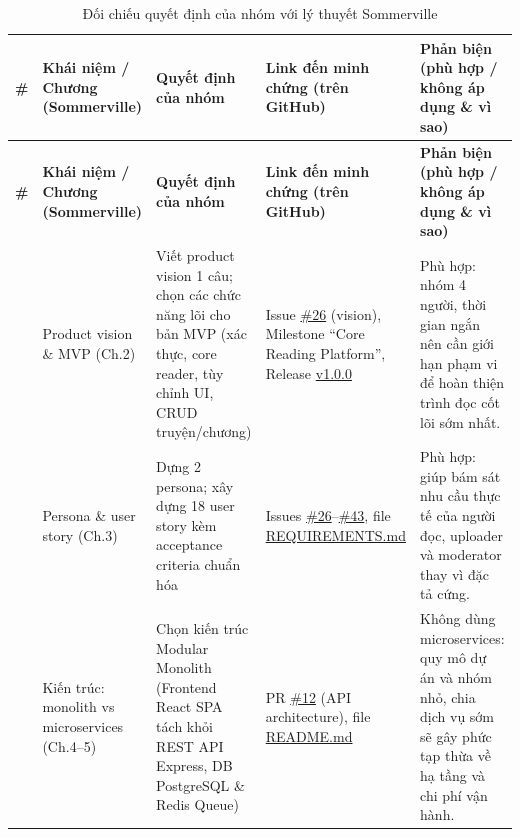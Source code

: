 \begin{landscape}
\vspace*{\fill}
\begingroup
\small
\begin{longtable}{|>{\centering\arraybackslash}p{0.8cm}|>{\RaggedRight\arraybackslash}p{4.2cm}|>{\RaggedRight\arraybackslash}p{6.0cm}|>{\RaggedRight\arraybackslash}p{5.5cm}|>{\RaggedRight\arraybackslash}p{6.5cm}|}
\caption{Đối chiếu quyết định của nhóm với lý thuyết Sommerville}\label{tab:sommerville-mapping}\\
\hline
\textbf{\#} & \textbf{Khái niệm / Chương (Sommerville)} & \textbf{Quyết định của nhóm} & \textbf{Link đến minh chứng (trên GitHub)} & \textbf{Phản biện (phù hợp / không áp dụng \& vì sao)} \\
\hline
\endfirsthead
\hline
\textbf{\#} & \textbf{Khái niệm / Chương (Sommerville)} & \textbf{Quyết định của nhóm} & \textbf{Link đến minh chứng (trên GitHub)} & \textbf{Phản biện (phù hợp / không áp dụng \& vì sao)} \\
\hline
\endhead
1 & Product vision \& MVP (Ch.2) & Viết product vision 1 câu; chọn các chức năng lõi cho bản MVP (xác thực, core reader, tùy chỉnh UI, CRUD truyện/chương) & Issue \href{https://github.com/suzynotsusie/cmc-truyen-temp/issues/26}{\#26} (vision), Milestone ``Core Reading Platform'', Release \href{https://github.com/suzynotsusie/cmc-truyen-temp/releases/tag/v1.0.0}{v1.0.0} & Phù hợp: nhóm 4 người, thời gian ngắn nên cần giới hạn phạm vi để hoàn thiện trình đọc cốt lõi sớm nhất. \\
\hline
2 & Persona \& user story (Ch.3) & Dựng 2 persona; xây dựng 18 user story kèm acceptance criteria chuẩn hóa & Issues \href{https://github.com/suzynotsusie/cmc-truyen-temp/issues/26}{\#26}--\href{https://github.com/suzynotsusie/cmc-truyen-temp/issues/43}{\#43}, file \href{https://github.com/suzynotsusie/cmc-truyen-temp/blob/main/docs/product/REQUIREMENTS.md}{REQUIREMENTS.md} & Phù hợp: giúp bám sát nhu cầu thực tế của người đọc, uploader và moderator thay vì đặc tả cứng. \\
\hline
3 & Kiến trúc: monolith vs microservices (Ch.4--5) & Chọn kiến trúc Modular Monolith (Frontend React SPA tách khỏi REST API Express, DB PostgreSQL \& Redis Queue) & PR \href{https://github.com/suzynotsusie/cmc-truyen-temp/pull/12}{\#12} (API architecture), file \href{https://github.com/suzynotsusie/cmc-truyen-temp/blob/main/README.md}{README.md} & Không dùng microservices: quy mô dự án và nhóm nhỏ, chia dịch vụ sớm sẽ gây phức tạp thừa về hạ tầng và chi phí vận hành. \\

\end{longtable}
\end{landscape}
